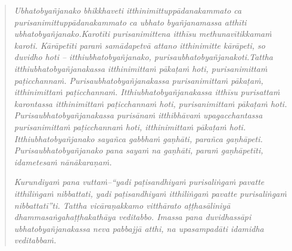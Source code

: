 \begin{quote}
\textit{Ubhatobyañjanako bhikkhaveti itthinimittuppādanakammato ca purisanimittuppādanakammato ca ubhato byañjanamassa atthīti ubhatobyañjanako.Karotīti purisanimittena itthīsu methunavītikkamaṁ karoti. Kārāpetīti paraṁ samādapetvā attano itthinimitte kārāpeti, so duvidho hoti – itthiubhatobyañjanako, purisaubhatobyañjanakoti.Tattha itthiubhatobyañjanakassa itthinimittaṁ pākaṭaṁ hoti, purisanimittaṁ paṭicchannaṁ. Purisaubhatobyañjanakassa purisanimittaṁ pākaṭaṁ, itthinimittaṁ paṭicchannaṁ. Itthiubhatobyañjanakassa itthīsu purisattaṁ karontassa itthinimittaṁ paṭicchannaṁ hoti, purisanimittaṁ pākaṭaṁ hoti. Purisaubhatobyañjanakassa purisānaṁ itthibhāvaṁ upagacchantassa purisanimittaṁ paṭicchannaṁ hoti, itthinimittaṁ pākaṭaṁ hoti. Itthiubhatobyañjanako sayañca gabbhaṁ gaṇhāti, parañca gaṇhāpeti. Purisaubhatobyañjanako pana sayaṁ na gaṇhāti, paraṁ gaṇhāpetīti, idametesaṁ nānākaraṇaṁ.}

\textit{Kurundiyaṁ pana vuttaṁ--``yadi paṭisandhiyaṁ purisaliṅgaṁ pavatte itthiliṅgaṁ nibbattati, yadi paṭisandhiyaṁ itthiliṅgaṁ pavatte purisaliṅgaṁ nibbattatī''ti. Tattha vicāraṇakkamo vitthārato aṭṭhasāliniyā dhammasaṅgahaṭṭhakathāya veditabbo. Imassa pana duvidhassāpi ubhatobyañjanakassa neva pabbajjā atthi, na upasampadāti idamidha veditabbaṁ.}
\end{quote}

